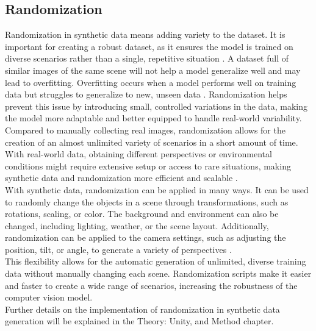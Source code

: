 \subsection{Randomization}
Randomization in synthetic data means adding variety to the dataset. It is important for creating a robust dataset, as it ensures the model is trained on diverse scenarios rather than a single, repetitive situation \cite{borkman2021unityperceptiongeneratesynthetic}. A dataset full of similar images of the same scene will not help a model generalize well and may lead to overfitting. Overfitting occurs when a model performs well on training data but struggles to generalize to new, unseen data \cite{Ying_2019}. Randomization helps prevent this issue by introducing small, controlled variations in the data, making the model more adaptable and better equipped to handle real-world variability.\\

\noindent Compared to manually collecting real images, randomization allows for the creation of an almost unlimited variety of scenarios in a short amount of time. With real-world data, obtaining different perspectives or environmental conditions might require extensive setup or access to rare situations, making synthetic data and randomization more efficient and scalable \cite{borkman2021unityperceptiongeneratesynthetic}. \\

\noindent With synthetic data, randomization can be applied in many ways. It can be used to randomly change the objects in a scene through transformations, such as rotations, scaling, or color. The background and environment can also be changed, including lighting, weather, or the scene layout. Additionally, randomization can be applied to the camera settings, such as adjusting the position, tilt, or angle, to generate a variety of perspectives \cite{borkman2021unityperceptiongeneratesynthetic}.\\

\noindent This flexibility allows for the automatic generation of unlimited, diverse training data without manually changing each scene. Randomization scripts make it easier and faster to create a wide range of scenarios, increasing the robustness of the computer vision model.\\

\noindent Further details on the implementation of randomization in synthetic data generation will be explained in the Theory: Unity, and Method chapter.


